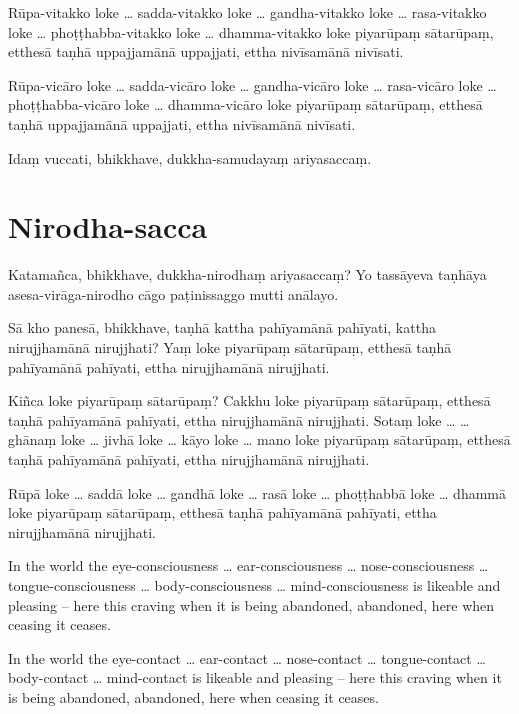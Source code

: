 \paliPage

Rūpa-vitakko loke \ldots{} sadda-vitakko loke \ldots{} gandha-vitakko loke \ldots{}
rasa-vitakko loke \ldots{} phoṭṭhabba-vitakko loke \ldots{} dhamma-vitakko loke
piyarūpaṃ sātarūpaṃ, etthesā taṇhā uppajjamānā uppajjati, ettha nivīsamānā
nivīsati.

Rūpa-vicāro loke \ldots{} sadda-vicāro loke \ldots{} gandha-vicāro loke \ldots{}
rasa-vicāro loke \ldots{} phoṭṭhabba-vicāro loke \ldots{} dhamma-vicāro loke
piyarūpaṃ sātarūpaṃ, etthesā taṇhā uppajjamānā uppajjati, ettha nivīsamānā
nivīsati.

Idaṃ vuccati, bhikkhave, dukkha-samudayaṃ ariyasaccaṃ.

\section*{Nirodha-sacca}

Katamañca, bhikkhave, dukkha-nirodhaṃ ariyasaccaṃ? Yo tassāyeva taṇhāya
asesa-virāga-nirodho cāgo paṭinissaggo mutti anālayo.

Sā kho panesā, bhikkhave, taṇhā kattha pahīyamānā pahīyati, kattha nirujjhamānā
nirujjhati? Yaṃ loke piyarūpaṃ sātarūpaṃ, etthesā taṇhā pahīyamānā pahīyati,
ettha nirujjhamānā nirujjhati.

Kiñca loke piyarūpaṃ sātarūpaṃ? Cakkhu loke piyarūpaṃ sātarūpaṃ, etthesā taṇhā
pahīyamānā pahīyati, ettha nirujjhamānā nirujjhati. Sotaṃ loke \ldots{}
\ldots{} ghānaṃ loke \ldots{} jivhā loke \ldots{} kāyo loke \ldots{} mano loke
piyarūpaṃ sātarūpaṃ, etthesā taṇhā pahīyamānā pahīyati, ettha nirujjhamānā
nirujjhati.

Rūpā loke \ldots{} saddā loke \ldots{} gandhā loke \ldots{} rasā loke \ldots{}
phoṭṭhabbā loke \ldots{} dhammā loke piyarūpaṃ sātarūpaṃ, etthesā taṇhā
pahīyamānā pahīyati, ettha nirujjhamānā nirujjhati.

\englishPage

In the world the eye-consciousness \ldots{} ear-consciousness \ldots{}
nose-consciousness \ldots{} tongue-consciousness \ldots{} body-consciousness
\ldots{} mind-consciousness is likeable and pleasing -- here this craving when
it is being abandoned, abandoned, here when ceasing it ceases.

In the world the eye-contact \ldots{} ear-contact \ldots{} nose-contact \ldots{}
tongue-contact \ldots{} body-contact \ldots{} mind-contact is likeable and
pleasing -- here this craving when it is being abandoned, abandoned, here when
ceasing it ceases.

